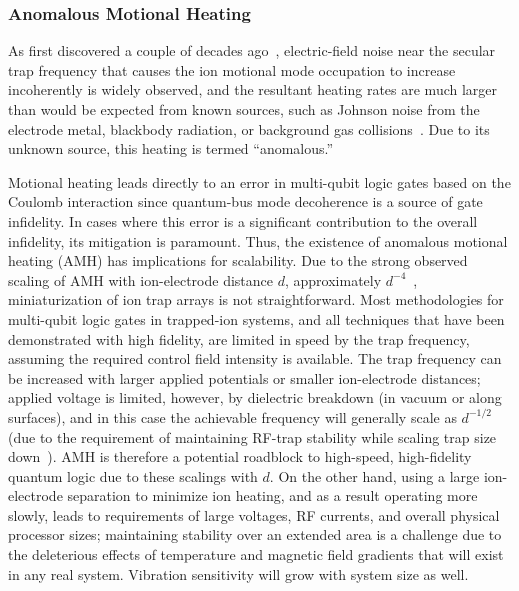 \documentclass[%
reprint,
 amsmath,amssymb,
]{revtex4-1}
\begin{document}
\subsubsection{Anomalous Motional Heating}
\label{AnomHeating}

As first discovered a couple of decades ago~\cite{turchette_2000}, electric-field noise near the secular trap frequency that causes the ion motional mode occupation to increase incoherently is widely observed, and the resultant heating rates are much larger than would be expected from known sources, such as Johnson noise from the electrode metal, blackbody radiation, or background gas collisions~\cite{brownnutt_2015}.  Due to its unknown source, this heating is termed ``anomalous.''

Motional heating leads directly to an error in multi-qubit logic gates \cite{MolmerSorensenGate} based on the Coulomb interaction since quantum-bus mode decoherence is a source of gate infidelity.  In cases where this error is a significant contribution to the overall infidelity, its mitigation is paramount. Thus, the existence of anomalous motional heating (AMH) has  implications for scalability.  Due to the strong observed scaling of AMH with ion-electrode distance $d$, approximately $d^{-4}$~\cite{PhysRevLett.97.103007_2006,hite_mckay_kotler_leibfried_wineland_pappas_2017,PhysRevLett.120.023201,PhysRevA.97.020302_2018},  miniaturization of ion trap arrays is not straightforward.  Most methodologies for multi-qubit logic gates in trapped-ion systems, and all techniques that have been demonstrated with high fidelity, are limited in speed by the trap frequency, assuming the required control field intensity is available.  The trap frequency can be increased with larger applied potentials or smaller ion-electrode distances; applied voltage is limited, however, by dielectric breakdown (in vacuum or along surfaces), and in this case the achievable frequency will generally scale as $d^{-1/2}$ (due to the requirement of maintaining RF-trap stability while scaling trap size down~\cite{NIST:SET:QIC:05}).  AMH is therefore a potential roadblock to high-speed, high-fidelity quantum logic due to these scalings with $d$. On the other hand, using a large ion-electrode separation to minimize ion heating, and as a result operating more slowly, leads to requirements of large voltages, RF currents, and overall physical processor sizes; maintaining stability over an extended area is a challenge due to the deleterious effects of temperature and magnetic field gradients that will exist in any real system.  Vibration sensitivity will grow with system size as well.
\end{document}
